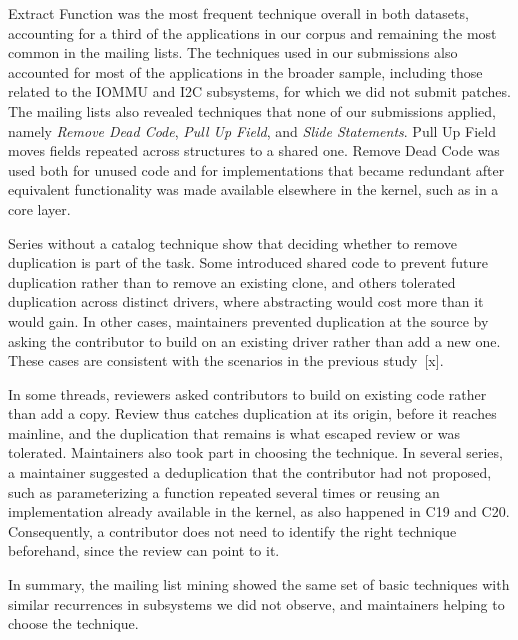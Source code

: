 \documentclass[10pt,conference]{IEEEtran}
\begin{document}
Extract Function was the most frequent technique overall in both datasets, accounting for a third of the applications in our corpus and remaining the most common in the mailing lists. The techniques used in our submissions also accounted for most of the applications in the broader sample, including those related to the IOMMU and I2C subsystems, for which we did not submit patches.
The mailing lists also revealed techniques that none of our submissions applied, namely \textit{Remove Dead Code}, \textit{Pull Up Field}, and \textit{Slide Statements}. Pull Up Field moves fields repeated across structures to a shared one. Remove Dead Code was used both for unused code and for implementations that became redundant after equivalent functionality was made available elsewhere in the kernel, such as in a core layer.

Series without a catalog technique show that deciding whether to remove duplication is part of the task. Some introduced shared code to prevent future duplication rather than to remove an existing clone, and others tolerated duplication across distinct drivers, where abstracting would cost more than it would gain. In other cases, maintainers prevented duplication at the source by asking the contributor to build on an existing driver rather than add a new one. These cases are consistent with the scenarios in the previous study~[x].

In some threads, reviewers asked contributors to build on existing code rather than add a copy. Review thus catches duplication at its origin, before it reaches mainline, and the duplication that remains is what escaped review or was tolerated.
Maintainers also took part in choosing the technique. In several series, a maintainer suggested a deduplication that the contributor had not proposed, such as parameterizing a function repeated several times or reusing an implementation already available in the kernel, as also happened in C19 and C20. Consequently, a contributor does not need to identify the right technique beforehand, since the review can point to it.

In summary, the mailing list mining showed the same set of basic techniques with similar recurrences in subsystems we did not observe, and maintainers helping to choose the technique.

\end{document}
